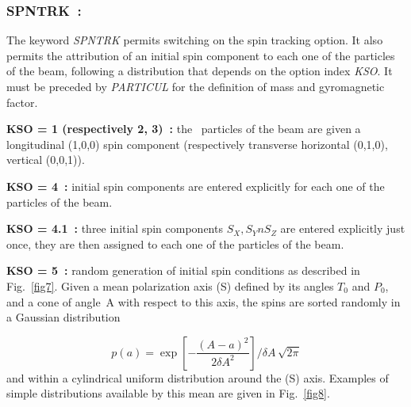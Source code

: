 \newpage

\subsubsection*{SPNTRK~: \SPNTRKTitl} \label{SPNTRK} 
\medskip

The keyword \textsl{SPNTRK} permits switching on the spin tracking 
option. It also permits the attribution of an initial spin component to each one of the 
\IMAX{} particles of the beam, following a distribution that depends 
on the option index \textsl{KSO}. It must be preceded by \textsl{PARTICUL} for
the definition of  mass and gyromagnetic factor.  
\medskip

\noindent\textbf{KSO = 1  (respectively 2, 3)~:} the \IMAX\ particles
of the beam are given a longitudinal (1,0,0) spin component (respectively 
transverse horizontal (0,1,0), vertical (0,0,1)).  
\medskip

\noindent\textbf{KSO = 4~:} initial spin components are entered explicitly for
each one of the \IMAX{} particles of the beam.  
\medskip

\noindent\textbf{KSO = 4.1~:} three initial spin components $S_X, S_Yn S_Z$ are entered explicitly just once, 
they are then assigned to  each one of the \IMAX{} particles of the beam.  
\medskip

\noindent\textbf{KSO = 5~:} random generation of \IMAX{} initial spin
conditions as described in Fig.~\ref{fig7}.  
Given a mean polarization axis (S) defined by its angles $ T_0 $ and $ P_0 $, 
and a cone of angle~A with respect to this axis, the \IMAX{} spins are sorted randomly in a 
Gaussian distribution

$$ p(a) = \exp \left[- \frac{(A-a)^2 }{ 2\delta A^2} \right]/ \delta A\,  \sqrt{2\pi}   $$
%
and within a cylindrical uniform distribution around the (S) 
axis. Examples of simple distributions available by this mean are 
given in Fig.~\ref{fig8}.  



